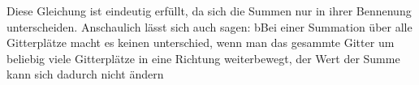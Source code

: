 Diese Gleichung ist eindeutig erfüllt, da sich die Summen nur in ihrer Bennenung unterscheiden. Anschaulich lässt sich auch sagen: bBei einer Summation über alle Gitterplätze macht es keinen unterschied, wenn man das gesammte Gitter um beliebig viele Gitterplätze in eine Richtung weiterbewegt, der Wert der Summe kann sich dadurch nicht ändern

